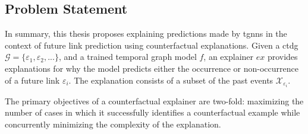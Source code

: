 

\subsection{Problem Statement}
\label{s_ProblemFormulation_ProblemStatement}

In summary, this thesis proposes explaining predictions made by \glspl{tgnn} in the context of future link prediction using counterfactual explanations. Given a \gls{ctdg} $\mathcal{G} = \{\varepsilon_{1}, \varepsilon_{2}, ...\}$, and a trained temporal graph model $f$, an explainer $ex$ provides explanations for why the model predicts either the occurrence or non-occurrence of a future link $\varepsilon_{i}$. The explanation consists of a subset of the past events $\mathcal{X}_{\varepsilon_{i}}$.

The primary objectives of a counterfactual explainer are two-fold: maximizing the number of cases in which it successfully identifies a counterfactual example while concurrently minimizing the complexity of the explanation.
